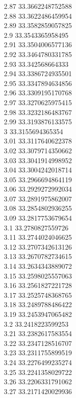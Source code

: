 {2.87	33.3662248752588\\
2.88	33.3622486459954\\
2.89	33.3582859057825\\
2.9	33.3543365958495\\
2.91	33.3504006577136\\
2.92	33.3464780331785\\
2.93	33.342568664333\\
2.94	33.3386724935501\\
2.95	33.3347894634856\\
2.96	33.3309195170768\\
2.97	33.3270625975415\\
2.98	33.3232186483767\\
2.99	33.3193876133575\\
3	33.3155694365354\\
3.01	33.3117640622378\\
3.02	33.3079714350662\\
3.03	33.3041914998952\\
3.04	33.3004242018714\\
3.05	33.2966694864119\\
3.06	33.2929272992034\\
3.07	33.2891975862007\\
3.08	33.2854802936255\\
3.09	33.2817753679654\\
3.1	33.2780827559726\\
3.11	33.2744024046625\\
3.12	33.2707342613126\\
3.13	33.2670782734615\\
3.14	33.2634343889072\\
3.15	33.2598025557063\\
3.16	33.2561827221728\\
3.17	33.2525748368765\\
3.18	33.2489788486422\\
3.19	33.2453947065482\\
3.2	33.2418223599253\\
3.21	33.2382617583554\\
3.22	33.2347128516707\\
3.23	33.2311755899519\\
3.24	33.2276499235274\\
3.25	33.2241358029722\\
3.26	33.2206331791062\\
3.27	33.2171420029936\\
}
